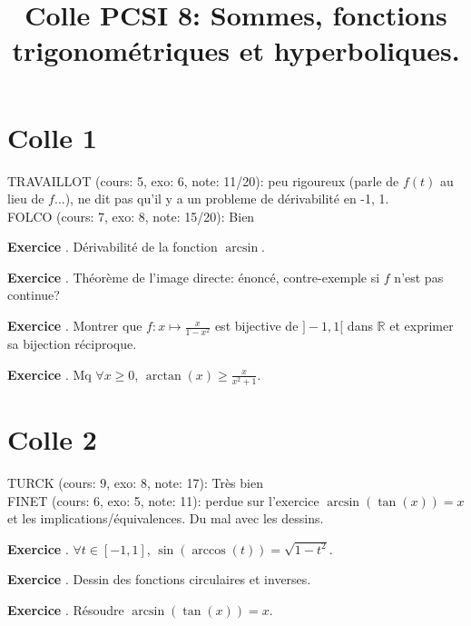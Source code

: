 \documentclass[10pt,a4paper]{article}
\title{Colle PCSI 8: Sommes, fonctions trigonométriques et hyperboliques.}
\newcounter{question}
\newcounter{exo}
\newenvironment{exo}{\vspace{0.5cm}\setcounter{question}{0}\addtocounter{exo}{1} \noindent \textbf{Exercice \theexo}. \normalsize }{\par}
\begin{document}
	\maketitle
	
	
	\section*{Colle 1}
	\setcounter{exo}{0}
	TRAVAILLOT (cours: 5, exo: 6, note: 11/20): peu rigoureux (parle de $f(t)$ au lieu de $f$...), ne dit pas qu'il y a un probleme de dérivabilité en -1, 1. \\
	FOLCO (cours: 7, exo: 8, note: 15/20): Bien
	
	\begin{exo}
		Dérivabilité de la fonction $\arcsin$. 
	\end{exo}
	
	\begin{exo}
		Théorème de l'image directe: énoncé, contre-exemple si $f$ n'est pas continue? 
	\end{exo}

	\begin{exo}
		Montrer que $f: x \longmapsto \frac{x}{1-x^2}$ est bijective de $]-1, 1[$ dans $\mathbb{R}$ et exprimer sa bijection réciproque.
	\end{exo}	

	\begin{exo}
		Mq $\forall x \geq 0$, $ \arctan(x) \geq \frac{x}{x^2 + 1}$.
	\end{exo}

	\section*{Colle 2}
	\setcounter{exo}{0}
	TURCK (cours: 9, exo: 8, note: 17): Très bien\\
	FINET (cours: 6, exo:  5, note: 11): perdue sur l'exercice $\arcsin(\tan(x)) = x$ et les implications/équivalences. Du mal avec les dessins.
	
	\begin{exo}
	    $\forall t \in [-1, 1]$, $\sin(\arccos(t)) = \sqrt{1 - t^2}$.
	\end{exo}

	\begin{exo}
		Dessin des fonctions circulaires et inverses.
	\end{exo}
		
	\begin{exo}
		Résoudre $\arcsin(\tan(x)) = x$.
	\end{exo}
			
\end{document}
